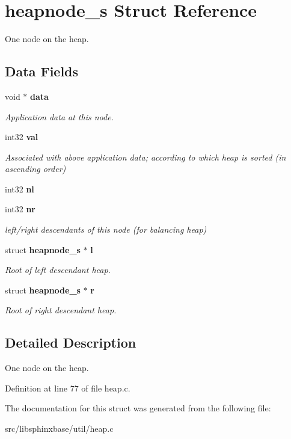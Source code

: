 \section{heapnode\+\_\+s Struct Reference}
\label{structheapnode__s}


One node on the heap.  


\subsection*{Data Fields}
\begin{DoxyCompactItemize}
\item 
\mbox{\label{structheapnode__s_a2cac1684dd94b922db98de988232efeb}} 
void $\ast$ \textbf{ data}
\begin{DoxyCompactList}\small\item\em Application data at this node. \end{DoxyCompactList}\item 
\mbox{\label{structheapnode__s_a02a74be7915860cf3fc436d5fed6fe7d}} 
int32 \textbf{ val}
\begin{DoxyCompactList}\small\item\em Associated with above application data; according to which heap is sorted (in ascending order) \end{DoxyCompactList}\item 
\mbox{\label{structheapnode__s_a9fd3eb832298ae9ca73896835d38e6d5}} 
int32 {\bfseries nl}
\item 
\mbox{\label{structheapnode__s_ab5a21ee1a48ce5359bbcca1d416a51eb}} 
int32 \textbf{ nr}
\begin{DoxyCompactList}\small\item\em left/right descendants of this node (for balancing heap) \end{DoxyCompactList}\item 
\mbox{\label{structheapnode__s_af25b6bfb16162294dd35851e04ad6c6b}} 
struct \textbf{ heapnode\+\_\+s} $\ast$ \textbf{ l}
\begin{DoxyCompactList}\small\item\em Root of left descendant heap. \end{DoxyCompactList}\item 
\mbox{\label{structheapnode__s_a92c30e27e1ccdbaea15f28aa49b0f7ea}} 
struct \textbf{ heapnode\+\_\+s} $\ast$ \textbf{ r}
\begin{DoxyCompactList}\small\item\em Root of right descendant heap. \end{DoxyCompactList}\end{DoxyCompactItemize}


\subsection{Detailed Description}
One node on the heap. 

Definition at line 77 of file heap.\+c.



The documentation for this struct was generated from the following file\+:\begin{DoxyCompactItemize}
\item 
src/libsphinxbase/util/heap.\+c\end{DoxyCompactItemize}
